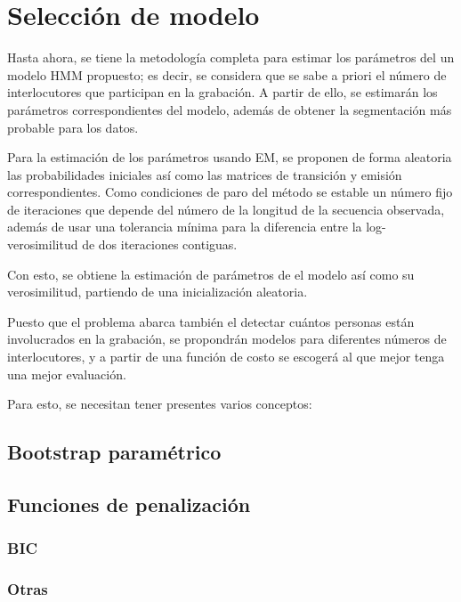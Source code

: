 
\chapter{Selección de modelo}


Hasta ahora, se tiene la metodología completa para estimar los parámetros del un modelo \ac{HMM} propuesto; es decir, se considera que se sabe a priori el número de interlocutores que participan en la grabación. A partir de ello, se estimarán los parámetros correspondientes del modelo, además de obtener la segmentación más probable para los datos.

Para la estimación de los parámetros usando \ac{EM}, se proponen de forma aleatoria las probabilidades iniciales así como las matrices de transición y emisión correspondientes. Como condiciones de paro del método se estable un número fijo de iteraciones que depende del número de la longitud de la secuencia observada, además de usar una tolerancia mínima para la diferencia entre la log-verosimilitud de dos iteraciones contiguas. 

Con esto, se obtiene la estimación de parámetros de el modelo así como su verosimilitud, partiendo de una inicialización aleatoria.

Puesto que el problema abarca también el detectar cuántos personas están involucrados en la grabación, se propondrán modelos para diferentes números de interlocutores, y a partir de una función de costo se escogerá al que mejor tenga una mejor evaluación.

Para esto, se necesitan tener presentes varios conceptos: 

\section{Bootstrap paramétrico}

\section{Funciones de penalización}

\subsection{BIC}
\subsection{Otras}


